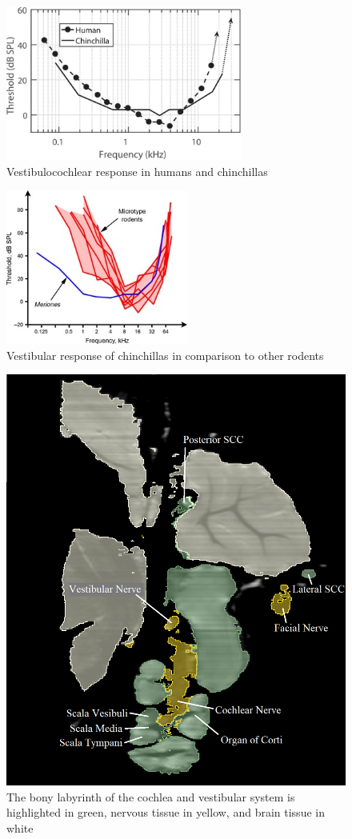 \documentclass[10pt]{article}
\begin{document}
\begin{figure}[H]
	\centering
	\includegraphics[height=2in]{response}
	\caption{Vestibulocochlear response in humans and chinchillas}
	\label{response}
\end{figure}
\begin{figure}[H]
	\centering
	\includegraphics[height=2in]{response2}
	\caption{Vestibular response of chinchillas in comparison to other rodents}
	\label{response2}
\end{figure}

\begin{figure}[H]
	\centering
	\includegraphics[scale=0.5]{segment2}
	\caption{The bony labyrinth of the cochlea and vestibular system is highlighted in green, nervous tissue in yellow, and brain tissue in white}
	\label{segment2}
\end{figure}
\end{document}

